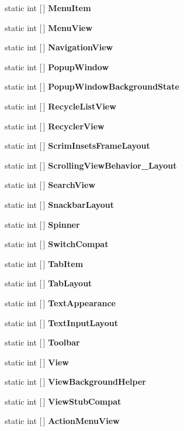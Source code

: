 \begin{DoxyCompactItemize}
static int \mbox{[}$\,$\mbox{]} {\bfseries Menu\+Item}
\item 
static int \mbox{[}$\,$\mbox{]} {\bfseries Menu\+View}
\item 
static int \mbox{[}$\,$\mbox{]} {\bfseries Navigation\+View}
\item 
static int \mbox{[}$\,$\mbox{]} {\bfseries Popup\+Window}
\item 
static int \mbox{[}$\,$\mbox{]} {\bfseries Popup\+Window\+Background\+State}
\item 
static int \mbox{[}$\,$\mbox{]} {\bfseries Recycle\+List\+View}
\item 
static int \mbox{[}$\,$\mbox{]} {\bfseries Recycler\+View}
\item 
static int \mbox{[}$\,$\mbox{]} {\bfseries Scrim\+Insets\+Frame\+Layout}
\item 
static int \mbox{[}$\,$\mbox{]} {\bfseries Scrolling\+View\+Behavior\+\_\+\+Layout}
\item 
static int \mbox{[}$\,$\mbox{]} {\bfseries Search\+View}
\item 
static int \mbox{[}$\,$\mbox{]} {\bfseries Snackbar\+Layout}
\item 
static int \mbox{[}$\,$\mbox{]} {\bfseries Spinner}
\item 
static int \mbox{[}$\,$\mbox{]} {\bfseries Switch\+Compat}
\item 
static int \mbox{[}$\,$\mbox{]} {\bfseries Tab\+Item}
\item 
static int \mbox{[}$\,$\mbox{]} {\bfseries Tab\+Layout}
\item 
static int \mbox{[}$\,$\mbox{]} {\bfseries Text\+Appearance}
\item 
static int \mbox{[}$\,$\mbox{]} {\bfseries Text\+Input\+Layout}
\item 
static int \mbox{[}$\,$\mbox{]} {\bfseries Toolbar}
\item 
static int \mbox{[}$\,$\mbox{]} {\bfseries View}
\item 
static int \mbox{[}$\,$\mbox{]} {\bfseries View\+Background\+Helper}
\item 
static int \mbox{[}$\,$\mbox{]} {\bfseries View\+Stub\+Compat}
\item 
\mbox{\label{classst_delivery_1_1_resource_1_1_styleable_af2d3e058f669a134db4599b5b85b60f3}} 
static int \mbox{[}$\,$\mbox{]} {\bfseries Action\+Menu\+View}
\end{DoxyCompactItemize}


